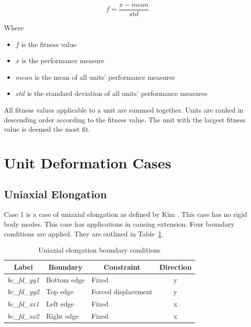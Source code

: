 \begin{equation}
	f=\frac{x-mean}{std}
\end{equation}

Where

\begin{itemize}
	\item $f$ is the fitness value
	\item $x$ is the performance measure
	\item $mean$ is the mean of all units' performance measures
	\item $std$ is the standard deviation of all units' performance measures
\end{itemize}

All fitness values applicable to a unit are summed together. Units are ranked in descending order according to the fitness value. The unit with the largest fitness value is deemed the most fit.

\section{Unit Deformation Cases}
\label{sec:UC}

\subsection{Uniaxial Elongation}

Case 1 is a case of uniaxial elongation as defined by Kim \cite{Kim2015}. This case has no rigid body modes. This case has applications in causing extension. Four boundary conditions are applied. They are outlined in Table~\ref{tab:c1}.

\begin{table}[H]
\centering
\begin{tabular}{@{}lllc@{}}
\toprule
\multicolumn{1}{c}{\textbf{Label}} & \multicolumn{1}{c}{\textbf{Boundary}} & \multicolumn{1}{c}{\textbf{Constraint}} & \textbf{Direction} \\ \midrule
\textit{bc\_fd\_yy1} & Bottom edge & Fixed               & y \\
\textit{bc\_fd\_yy2} & Top edge    & Forced displacement & y \\
\textit{bc\_fd\_xx1} & Left edge   & Fixed               & x \\
\textit{bc\_fd\_xx2} & Right edge  & Fixed               & x \\ \bottomrule
\end{tabular}
\caption{Uniaxial elongation boundary conditions \cite{Kim2015}}
\label{tab:c1}
\end{table}

